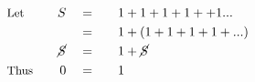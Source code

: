 \begin{alignat*}{5}
&\small\text{Let}\quad&S\quad&=\quad&&1+1+1+1++1...\\
&\,&\,&=&&1+(1+1+1+1+...)\\
&\,&\cancel{S}\quad&=&&1+\cancel{S}\\
&\small\text{Thus}\quad&0\quad&=&&1
\end{alignat*}

